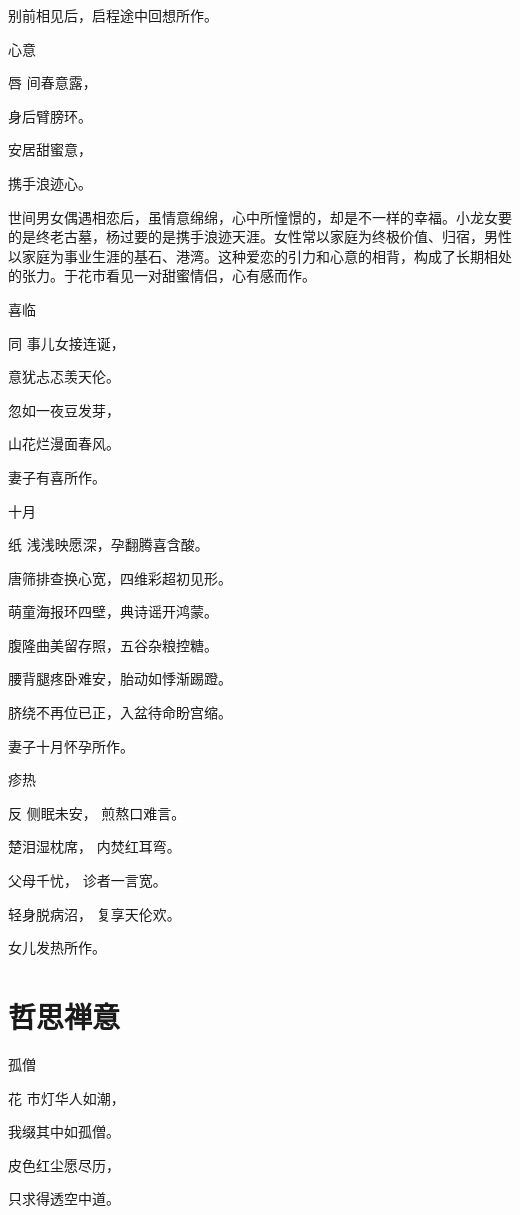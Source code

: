 \documentclass{article}
\newenvironment{poem}[3]{
\begin{minipage}{\textwidth}
\begin{pinyinscope}\begin{center}\Large\linespread{1.4}\selectfont #2\end{center}\end{pinyinscope}
\begin{pinyinscope}
	\begin{center}
	\Large\linespread{1.4}\rmfamily\selectfont #3
}{\end{center}
\end{pinyinscope}
\end{minipage}
}
\begin{document}
别前相见后，启程途中回想所作。

\begin{poem}{}{心意}
唇间春意露，

身后臂膀环。

安居甜蜜意，

携手浪迹心。
\end{poem}

世间男女偶遇相恋后，虽情意绵绵，心中所憧憬的，却是不一样的幸福。小龙女要的是终老古墓，杨过要的是携手浪迹天涯。女性常以家庭为终极价值、归宿，男性以家庭为事业生涯的基石、港湾。这种爱恋的引力和心意的相背，构成了长期相处的张力。于花市看见一对甜蜜情侣，心有感而作。

\begin{poem}{}{喜临}
同事儿女接连诞，

意犹忐忑羡天伦。

忽如一夜豆发芽，

山花烂漫面春风。
\end{poem}

妻子有喜所作。

\begin{poem}{}{十月}
纸{}浅浅映愿深，孕{}翻腾喜含酸。

唐筛排查换心宽，四维彩超初见形。

萌童海报环四壁，典{}诗谣开鸿蒙。

腹隆曲美留存照，五谷杂粮控{}糖。

腰背腿疼卧难安，胎动如悸渐踢蹬。

脐绕不再位已正，入盆待命盼宫缩。
\end{poem}

妻子十月怀孕所作。

\begin{poem}{}{疹热}
反侧眠未安，
煎熬口难言。

楚泪湿枕席，
内焚红耳弯。

父母千{}忧，
诊者一言宽。

轻身脱病沼，
复享天伦欢。
\end{poem}

女儿发热所作。

\section{哲思禅意}

\begin{poem}{}{孤僧}
花市灯华人如潮，

我缀其中如孤僧。

皮色红尘愿尽历，

只求得透空中道。
\end{poem}
\end{document}
